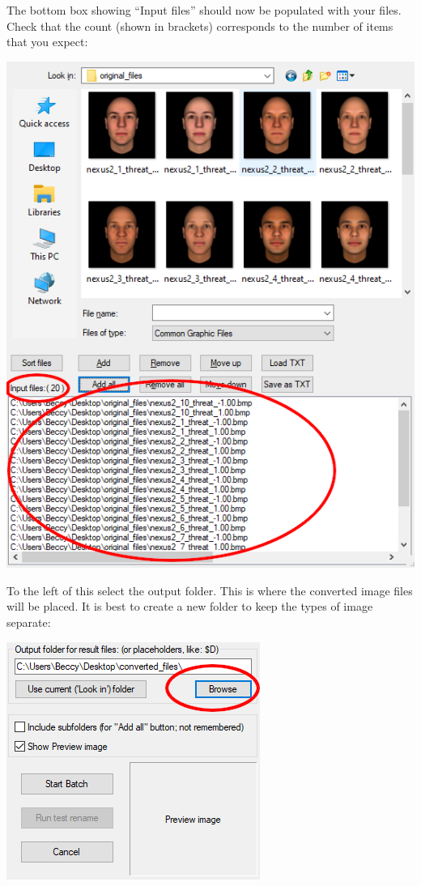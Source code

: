 \documentclass[]{book}
\begin{document}
The bottom box showing ``Input files'' should now be populated with your
files. Check that the count (shown in brackets) corresponds to the
number of items that you expect:

\includegraphics{images/screenshots/irfanview_5a.png}

To the left of this select the output folder. This is where the
converted image files will be placed. It is best to create a new folder
to keep the types of image separate:

\includegraphics{images/screenshots/irfanview_6.png}
\end{document}
